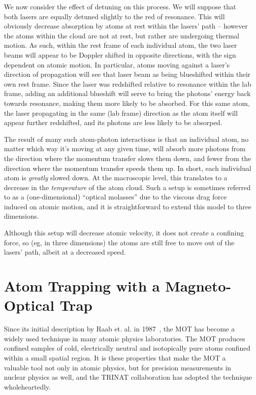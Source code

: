 We now consider the effect of detuning on this process.  We will suppose that both lasers are equally detuned slightly to the red of resonance.  This will obviously decrease absorption by atoms at rest within the lasers' path -- however the atoms within the cloud are not at rest, but rather are undergoing thermal motion.  As such, within the rest frame of each individual atom, the two laser beams will appear to be Doppler shifted in opposite directions, with the sign dependent on atomic motion.  In particular, atoms moving against a laser's direction of propagation will see that laser beam as being blueshifted within their own rest frame.  Since the laser was redshifted relative to resonance within the lab frame, adding an additional blueshift will serve to bring the photons' energy back towards resonance, making them more likely to be absorbed.  For this same atom, the laser propagating in the same (lab frame) direction as the atom itself will appear further redshifted, and its photons are less likely to be absorped.  

The result of many such atom-photon interactions is that an individual atom, no matter which way it's moving at any given time, will absorb more photons from the direction where the momentum transfer slows them down, and fewer from the direction where the momentum transfer speeds them up.  In short, each individual atom is \emph{greatly} slowed down.  At the macroscopic level, this translates to a decrease in the \emph{temperature} of the atom cloud.  Such a setup is sometimes referred to as a (one-dimensional) ``optical molasses'' due to the viscous drag force induced on atomic motion, and it is straightforward to extend this model to three dimensions.

Although this setup will decrease atomic velocity, it does not create a confining force, so (eg, in three dimensions) the atoms are still free to move out of the lasers' path, albeit at a decreased speed.






\section{Atom Trapping with a Magneto-Optical Trap}
\label{section:mot}
Since its initial description by Raab et. al. in 1987~\cite{raabprentiss}, the \ac{MOT} has become a widely used technique in many atomic physics laboratories. The MOT produces confined samples of cold, electrically neutral and isotopically pure atoms confined within a small spatial region.  It is these properties that make the MOT a valuable tool not only in atomic physics, but for precision measurements in nuclear physics as well, and the \ac{TRINAT} collaboration has adopted the technique wholeheartedly.

